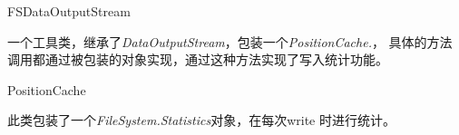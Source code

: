 \begin{XeClass}{FSDataOutputStream}
   
 一个工具类，继承了\emph{DataOutputStream}，包装一个\emph{PositionCache.}，
 具体的方法调用都通过被包装的对象实现，通过这种方法实现了写入统计功能。

  \begin{XeInnerClass}{PositionCache}
     
 此类包装了一个\emph{FileSystem.Statistics}对象，在每次write
 时进行统计。

  \end{XeInnerClass}
\end{XeClass}

